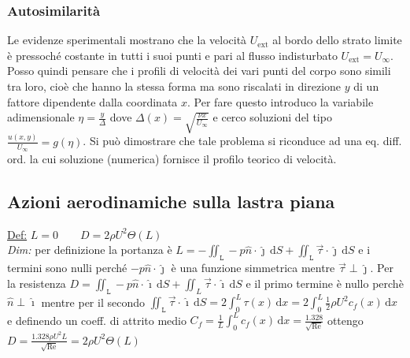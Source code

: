 \documentclass[11pt,a4paper]{report}
\newcommand{\de}{\mathrm d}
\begin{document}
{			\subsubsection{Autosimilarità}
			Le evidenze sperimentali mostrano che la velocità $U_\mathrm{ext}$ al bordo dello strato limite è pressoché costante in tutti i suoi punti e pari al flusso indisturbato $U_\mathrm{ext}=U_\infty$. Posso quindi pensare che i profili di velocità dei vari punti del corpo sono simili tra loro, cioè che hanno la stessa forma ma sono riscalati in direzione $y$ di un fattore dipendente dalla coordinata $x$. Per fare questo introduco la variabile adimensionale $\eta=\frac{y}{\Delta}$ dove $\Delta(x)=\sqrt{\frac{\nu x}{U_\infty}}$ e cerco soluzioni del tipo $\frac{u(x,y)}{U_\infty}=g(\eta)$. Si può dimostrare che tale problema si riconduce ad una eq. diff. ord. la cui soluzione (numerica) fornisce il profilo teorico di velocità.
		\subsection{Azioni aerodinamiche sulla lastra piana}
		\underline{Def:} $L=0\qquad D=2\rho U^2\Theta(L)$\\
		\textit{Dim:} per definizione la portanza è $L=-\iint_\mathtt L -p\hat n\cdot\hat \jmath\,\de S+\iint_\mathtt L\vec\tau\cdot\hat\jmath\,\de S$ e i termini sono nulli perché $-p\hat n\cdot\hat\jmath$ è una funzione simmetrica mentre $\vec\tau\perp\hat\jmath$. Per la resistenza $D=\iint_\mathtt L -p\hat n\cdot\hat\imath\,\de S+\iint_L \vec\tau\cdot\hat\imath\,\de S$ e il primo termine è nullo perchè $\hat n\perp\hat\imath$ mentre per il secondo $\iint_\mathtt L\vec\tau\cdot\hat\imath\,\de S=2\int_0^L\tau(x)\,\de x=2\int_0^L\frac 12\rho U^2c_f(x)\,\de x$ e definendo un coeff. di attrito medio $C_f=\frac 1L\int_0^Lc_f(x)\,\de x=\frac{1.328}{\sqrt{\mathrm{Re}}}$ ottengo $D=\frac{1.328\rho U^2 L}{\sqrt{\mathrm{Re}}}=2\rho U^2\Theta(L)$
	
}
\end{document}

